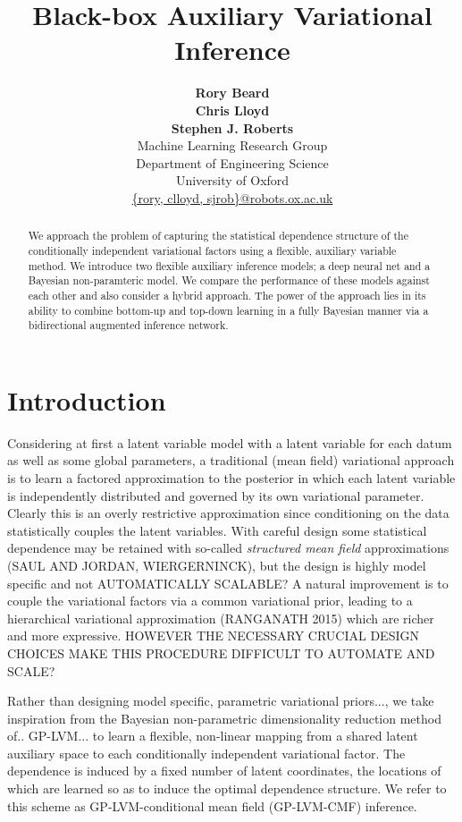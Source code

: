 \documentclass[]{article}
\title{Black-box Auxiliary Variational Inference}
\author{ {\bf Rory Beard} \\
\And
{\bf Chris Lloyd}  \\
\And
{\bf Stephen J. Roberts}   \\
\AND
\textnormal{Machine Learning Research Group} \\
\textnormal{Department of Engineering Science}\\
\textnormal{University of Oxford} \\
\url{{rory, clloyd, sjrob}@robots.ox.ac.uk}
}
\begin{document}
\maketitle

\begin{abstract}
We approach the problem of capturing the statistical dependence structure of the conditionally independent variational factors using a flexible, auxiliary variable method. We introduce two flexible auxiliary inference models; a deep neural net and a Bayesian non-paramteric model. We compare the performance of these models against each other and also consider a hybrid approach. The power of the approach lies in its ability to combine bottom-up and top-down learning in a fully Bayesian manner via a bidirectional augmented inference network.
\end{abstract}

\section{Introduction}\label{sec:intro}


Considering at first a latent variable model with a latent variable for each datum as well as some global parameters, a traditional (mean field) variational approach is to learn a factored approximation to the posterior in which each latent variable is independently distributed and governed by its own variational parameter.
Clearly this is an overly restrictive approximation since conditioning on the data statistically couples the latent variables.
With careful design some statistical dependence may be retained with so-called \emph{structured mean field} approximations (SAUL AND JORDAN, WIERGERNINCK), but the design is highly model specific and not AUTOMATICALLY SCALABLE?
A natural improvement is to couple the variational factors via a common variational prior, leading to a hierarchical variational approximation (RANGANATH 2015) which are richer and more expressive.
HOWEVER THE NECESSARY CRUCIAL DESIGN CHOICES MAKE THIS PROCEDURE DIFFICULT TO AUTOMATE AND SCALE?

Rather than designing model specific, parametric variational priors..., we take inspiration from the Bayesian non-parametric dimensionality reduction method of.. GP-LVM... to learn a flexible, non-linear mapping from a shared latent auxiliary space to each conditionally independent variational factor.
The dependence is induced by a fixed number of latent coordinates, the locations of which are learned so as to induce the optimal dependence structure. We refer to this scheme as GP-LVM-conditional mean field (GP-LVM-CMF) inference.
\end{document}
